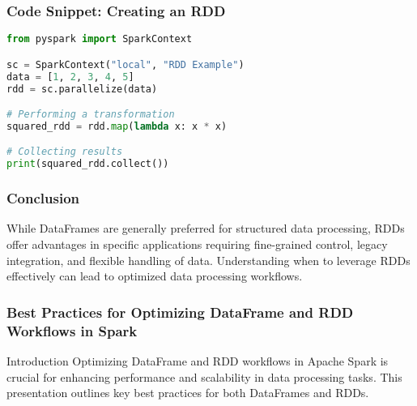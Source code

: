 \documentclass[aspectratio=169]{beamer}
\begin{document}
\begin{frame}[fragile]
    \frametitle{Code Snippet: Creating an RDD}
    
    \begin{lstlisting}[language=Python]
from pyspark import SparkContext

sc = SparkContext("local", "RDD Example")
data = [1, 2, 3, 4, 5]
rdd = sc.parallelize(data)

# Performing a transformation
squared_rdd = rdd.map(lambda x: x * x)

# Collecting results
print(squared_rdd.collect())
    \end{lstlisting}
\end{frame}

\begin{frame}[fragile]
    \frametitle{Conclusion}
    
    While DataFrames are generally preferred for structured data processing, RDDs offer advantages in specific applications requiring fine-grained control, legacy integration, and flexible handling of data. Understanding when to leverage RDDs effectively can lead to optimized data processing workflows.
\end{frame}

\begin{frame}[fragile]
    \frametitle{Best Practices for Optimizing DataFrame and RDD Workflows in Spark}
    \begin{block}{Introduction}
        Optimizing DataFrame and RDD workflows in Apache Spark is crucial for enhancing performance and scalability in data processing tasks. This presentation outlines key best practices for both DataFrames and RDDs.
    \end{block}
\end{frame}
\end{document}
